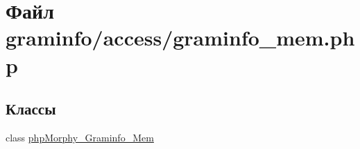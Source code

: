 \hypertarget{graminfo__mem_8php}{
\section{Файл graminfo/access/graminfo\_\-mem.php}
\label{graminfo__mem_8php}
}
\subsection*{Классы}
\begin{DoxyCompactItemize}
\item 
class \hyperlink{classphpMorphy__Graminfo__Mem}{phpMorphy\_\-Graminfo\_\-Mem}
\end{DoxyCompactItemize}
